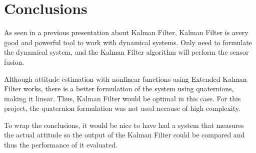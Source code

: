 \section{Conclusions}
As seen in a previous presentation about Kalman Filter, Kalman Filter is avery good and powerful tool to work with dynamical systems. Only need to formulate the dynamical system, and the Kalman Filter algorithm will perform the sensor fusion.

Although attitude estimation with nonlinear functions using Extended Kalman Filter works, there is a better formulation of the system using quaternions, making it linear. Thus, Kalman Filter would be optimal in this case. For this project, the quaternion formulation was not used necause of high complexity.

To wrap the conclusions, it would be nice to have had a system that measures the actual attitude so the output of the Kalman Filter could be compared and thus the performance of it evaluated.